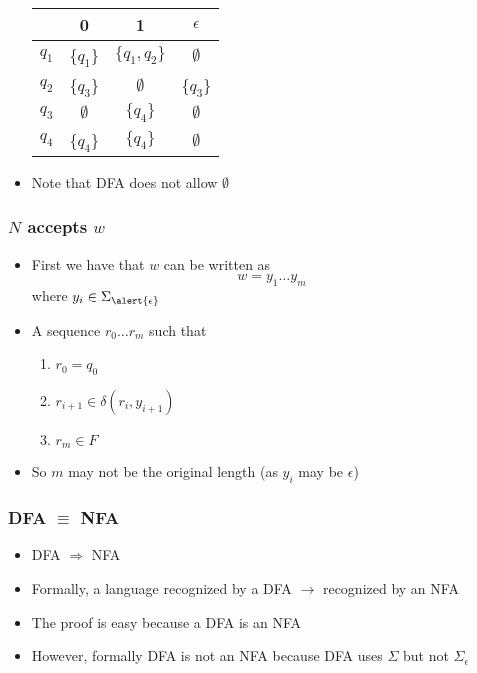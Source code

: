 \begin{frame}[allowframebreaks]
\begin{itemize}
  \begin{center}
  \begin{tabular}{c|ccc}
& 0 & 1 & $\epsilon$\\ 
\hline
$q_1$ & \{$q_1$\} & $\{q_1, q_2\}$ & $\emptyset$\\
$q_2$ & \{$q_3$\} & $\emptyset$ & \{$q_3$\}\\
$q_3$ & $\emptyset$ & $\{q_4\}$ & $\emptyset$\\
$q_4$ & \{$q_4$\} & $\{q_4\}$ & $\emptyset$
  \end{tabular}
\end{center}
\item Note that DFA does not allow $\emptyset$ 
\end{itemize}\end{frame}

\begin{frame}[allowframebreaks] \frametitle{$N$ accepts $w$}
  \begin{itemize}
\item First we have that $w$ can be written as 
  \begin{equation*}
    w = y_1 \ldots y_m
  \end{equation*}
where $y_i \in \Sigma_{\alert{\epsilon}}$
\item A sequence $r_0 \ldots r_m$ such that

  \begin{enumerate}
  \item $r_0=q_0$
  \item $r_{i+1}\in \delta(r_i,y_{i+1})$
  \item $r_m\in F$
  \end{enumerate}
\item So $m$ may not be the original length (as $y_i$ may be
  $\epsilon$)
\end{itemize}\end{frame} \begin{frame}[allowframebreaks] \frametitle{DFA $\equiv$ NFA}
  \begin{itemize}
\item DFA $\Rightarrow$ NFA

\item Formally, a language recognized by a DFA $\rightarrow$
  recognized by an NFA

\item The proof is easy because a DFA is an NFA
\item However, \alert{formally DFA is not an NFA}
because DFA uses $\Sigma$ but not $\Sigma_\epsilon$


\end{itemize}
\end{frame}
